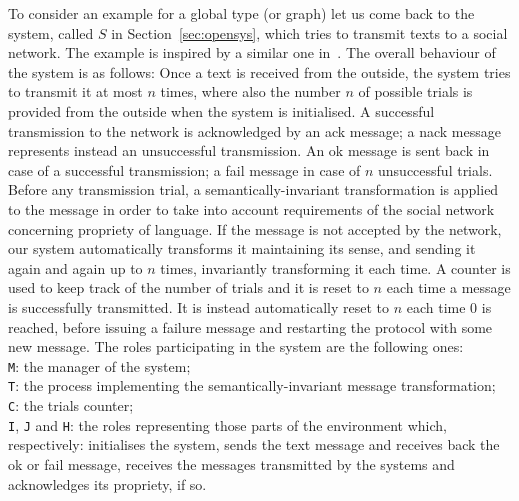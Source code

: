 To consider an example for a global type (or graph) let us come back to the system,
called $S$ in Section~\ref{sec:opensys},
which tries to transmit texts to a social network. The example is inspired by
a similar one in~\cite{deAlfaro2005}.
The overall behaviour of the system is as follows:
Once a text is received from the outside, the system tries to transmit it at most $n$ times, where also the number $n$ of possible trials is provided from the outside when the system is initialised.
A successful transmission to the network is acknowledged by an {\sf ack} message; a {\sf nack} message
represents instead an unsuccessful transmission.
An {\sf ok} message is sent back in case of a successful transmission; a {\sf fail} message
in case of $n$ unsuccessful trials.
Before any transmission trial, a semantically-invariant transformation is applied to the message
in order to take into account requirements of the social network
concerning propriety of language.
If the message is not accepted by the
network, our system automatically transforms it maintaining its sense, and sending it again and again up to $n$ times, invariantly transforming it each time. 
A counter is used to keep track of the number of  trials and it is reset to $n$ each time
a message is successfully transmitted. It is instead automatically reset to $n$ each time $0$ is reached, before 
issuing a failure message and restarting the protocol with some new message.
The roles participating in the system are the following ones:\\
{\tt M}: the manager of the system;\\
{\tt T}: the process implementing the semantically-invariant message transformation;\\
{\tt C}: the trials counter;\\
{\tt I}, {\tt J} and {\tt H}: the roles representing those
parts of the environment which, respectively: initialises the system, sends the text message
and receives back the {\sf ok} or {\sf fail} message, receives the messages transmitted 
by the systems and acknowledges its propriety, if so.

